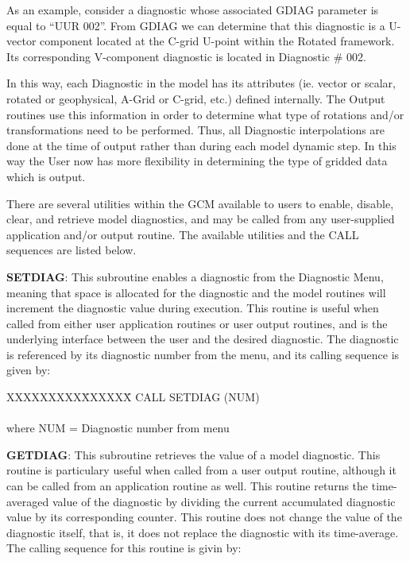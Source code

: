 As an example, consider a diagnostic whose associated GDIAG parameter is equal
to ``UUR 002''.  From GDIAG we can determine that this diagnostic is a 
U-vector component located at the C-grid U-point within the Rotated framework.
Its corresponding V-component diagnostic is located in Diagnostic \# 002.

In this way, each Diagnostic in the model has its attributes (ie. vector or scalar,
rotated or geophysical, A-Grid or C-grid, etc.) defined internally.  The Output routines
use this information in order to determine
what type of rotations and/or transformations need to be performed.  Thus, all Diagnostic
interpolations are done at the time of output rather than during each model dynamic step.
In this way the User now has more flexibility
in determining the type of gridded data which is output.

There are several utilities within the GCM available to users to enable, disable,
clear, and retrieve model diagnostics, and may be called from any user-supplied application
and/or output routine.  The available utilities and the CALL sequences are listed below.


{\bf SETDIAG}:  This subroutine enables a diagnostic from the Diagnostic Menu, meaning that 
space is allocated for the diagnostic and the
model routines will increment the diagnostic value during execution.  This routine is useful when
called from either user application routines or user output routines, and is the underlying interface
between the user and the desired diagnostic.  The diagnostic is referenced by its diagnostic
number from the menu, and its calling sequence is given by:

\begin{tabbing}
XXXXXXXXX\=XXXXXX\= \kill
\>        CALL SETDIAG (NUM) \\
\\
where \>  NUM   \>= Diagnostic number from menu \\
\end{tabbing}


{\bf GETDIAG}:  This subroutine retrieves the value of a model diagnostic.  This routine is
particulary useful when called from a user output routine, although it can be called from an
application routine as well.  This routine returns the time-averaged value of the diagnostic by
dividing the current accumulated diagnostic value by its corresponding counter.  This routine does
not change the value of the diagnostic itself, that is, it does not replace the diagnostic with its
time-average.  The calling sequence for this routine is givin by:

